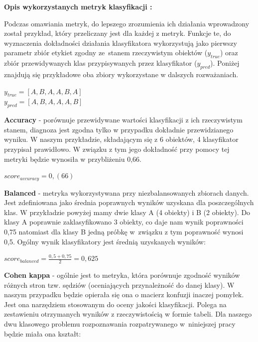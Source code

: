 \documentclass[12pt]{article}
\begin{document}
\centerline{\textbf{Opis wykorzystanych metryk klasyfikacji \cite{bib4}: }}
Podczas omawiania metryk, do lepszego zrozumienia ich działania wprowadzony został przykład, który przeliczany jest dla każdej z metryk. Funkcje te, do wyznaczenia dokładności działania klasyfikatora wykorzystują jako pierwszy parametr zbiór etykiet zgodny ze~stanem rzeczywistym  obiektów ($y_{true}$) oraz zbiór przewidywanych klas przypisywanych przez klasyfikator ($y_{pred}$). Poniżej znajdują się przykładowe oba zbiory wykorzystane w dalszych rozważaniach. \\
\begin{center}
$ y_{true} = [A, B, A, A, B, A]$ \\
$ y_{pred} = [A, B, A, A, A, B]$ \\
\end{center}
\textbf{Accuracy} - porównuje przewidywane wartości klasyfikacji z ich rzeczywistym stanem, diagnoza jest zgodna tylko w przypadku dokładnie przewidzianego wyniku. W naszym przykładzie, składającym się z 6 obiektów, 4 klasyfikator przypisał prawidłowo. W związku z tym jego dokładność przy pomocy tej metryki będzie wynosiła w przybliżeniu 0,66.
\begin{center}
$ score_{accuracy} = 0,(66) $
\end{center}
\textbf{Balanced} - metryka wykorzystywana przy niezbalansowanych zbiorach danych. Jest zdefiniowana jako średnia poprawnych wyników uzyskana dla poszczególnych klas. W przykładzie powyżej mamy dwie klasy A (4 obiekty) i B (2 obiekty). Do klasy A poprawnie zaklasyfikowano 3  obiekty, co daje nam wynik poprawności 0,75 natomiast dla klasy B jedną próbkę w~związku z tym poprawność wynosi 0,5. Ogólny wynik klasyfikatory jest średnią uzyskanych wyników:
\begin{center}
$ score_{balanced} = \frac{0,5+0,75}{2} = 0,625 $
\end{center}
\textbf{Cohen kappa} - ogólnie jest to metryka, która porównuje zgodność wyników różnych stron tzw. sędziów (oceniających przynależność do danej klasy). W naszym przypadku będzie opierała się ona o macierz konfuzji inaczej pomyłek. Jest ona narzędziem stosowanym do oceny jakości klasyfikacji. Polega na zestawieniu otrzymanych wyników z rzeczywistością w formie tabeli. Dla naszego dwu klasowego problemu rozpoznawania rozpatrywanego w~niniejszej pracy będzie miała ona kształt:
\end{document}
